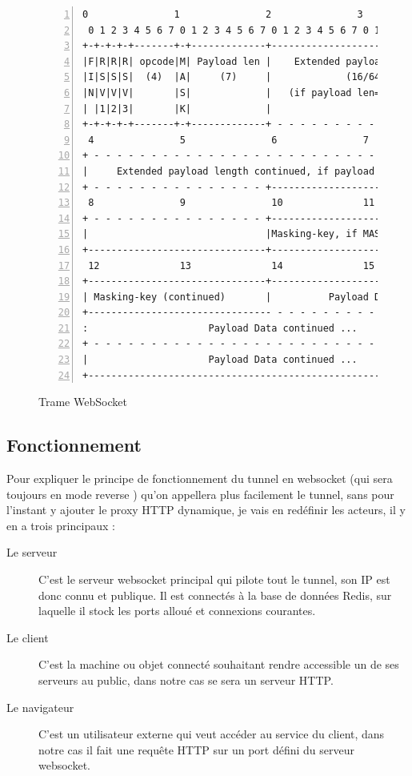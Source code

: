 \begin{figure}[htp]
\centering
\begin{lstlisting}[gobble=0, numbers=left, frame=l,
  basewidth={0.55em, 0.4em}]
 0               1               2               3              
 0 1 2 3 4 5 6 7 0 1 2 3 4 5 6 7 0 1 2 3 4 5 6 7 0 1 2 3 4 5 6 7
+-+-+-+-+-------+-+-------------+-------------------------------+
|F|R|R|R| opcode|M| Payload len |    Extended payload length    |
|I|S|S|S|  (4)  |A|     (7)     |             (16/64)           |
|N|V|V|V|       |S|             |   (if payload len==126/127)   |
| |1|2|3|       |K|             |                               |
+-+-+-+-+-------+-+-------------+ - - - - - - - - - - - - - - - +
 4               5               6               7              
+ - - - - - - - - - - - - - - - - - - - - - - - - - - - - - - - +
|     Extended payload length continued, if payload len == 127  |
+ - - - - - - - - - - - - - - - +-------------------------------+
 8               9               10              11             
+ - - - - - - - - - - - - - - - +-------------------------------+
|                               |Masking-key, if MASK set to 1  |
+-------------------------------+-------------------------------+
 12              13              14              15
+-------------------------------+-------------------------------+
| Masking-key (continued)       |          Payload Data         |
+-------------------------------- - - - - - - - - - - - - - - - +
:                     Payload Data continued ...                :
+ - - - - - - - - - - - - - - - - - - - - - - - - - - - - - - - +
|                     Payload Data continued ...                |
+---------------------------------------------------------------+
\end{lstlisting}
\caption{Trame WebSocket}
\end{figure}

\subsection{Fonctionnement}

Pour expliquer le principe de fonctionnement du tunnel en websocket
(qui sera toujours en mode \og reverse \fg{}) qu'on appellera plus
facilement le tunnel, sans pour l'instant y ajouter le proxy HTTP
dynamique, je vais en redéfinir les acteurs, il y en a trois
principaux :
\begin{description}
\item[Le serveur] C'est le serveur websocket principal qui pilote tout
  le tunnel, son IP est donc connu et publique. Il est connectés à la
  base de données Redis, sur laquelle il stock les ports alloué et
  connexions courantes.
\item[Le client] C'est la machine ou objet connecté souhaitant rendre
  accessible un de ses serveurs au public, dans notre cas se sera un
  serveur HTTP.
\item[Le navigateur] C'est un utilisateur externe qui veut accéder au
  service du client, dans notre cas il fait une requête HTTP sur un
  port défini du serveur websocket.
\end{description}

